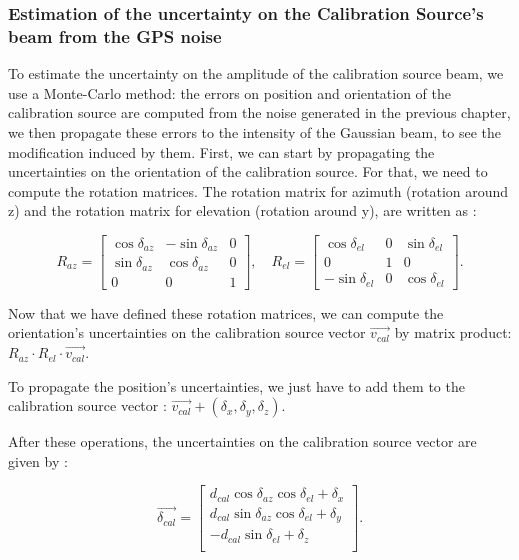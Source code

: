 \documentclass[../../thesis.tex]{subfiles}
\begin{document}
\subsubsection{Estimation of the uncertainty on the Calibration Source's beam from the GPS noise}

To estimate the uncertainty on the amplitude of the calibration source beam, we use a Monte-Carlo method: the errors on position and orientation of the calibration source are computed from the noise generated in the previous chapter, we then propagate these errors to the intensity of the Gaussian beam, to see the modification induced by them.
First, we can start by propagating the uncertainties on the orientation of the calibration source. For that, we need to compute the rotation matrices. The rotation matrix for azimuth (rotation around z) and the rotation matrix for elevation (rotation around y), are written as :

\begin{equation}
    R_{az} =
    \begin{bmatrix}
        \cos\delta_{az} & -\sin\delta_{az} & 0 \\
        \sin\delta_{az} & \cos\delta_{az}  & 0 \\
        0               & 0                & 1
    \end{bmatrix},
    \quad
    R_{el} =
    \begin{bmatrix}
        \cos\delta_{el}  & 0 & \sin\delta_{el} \\
        0                & 1 & 0               \\
        -\sin\delta_{el} & 0 & \cos\delta_{el}
    \end{bmatrix}.
\end{equation}

Now that we have defined these rotation matrices, we can compute the orientation's uncertainties on the calibration source vector $\vec{v_{cal}}$ by matrix product: $R_{az} \cdot R_{el} \cdot \vec{v_{cal}}$.

To propagate the position's uncertainties, we just have to add them to the calibration source vector : $\vec{v_{cal}} + (\delta_x, \delta_y, \delta_z)$.

After these operations, the uncertainties on the calibration source vector are given by :

\begin{equation}
    \vec{\delta_{cal}} =
    \begin{bmatrix}
        d_{cal} \cos\delta_{az}\cos\delta_{el} + \delta_x \\
        d_{cal} \sin\delta_{az}\cos\delta_{el} + \delta_y \\
        - d_{cal} \sin\delta_{el} + \delta_z              \\
    \end{bmatrix}.
\end{equation}
\end{document}
